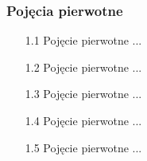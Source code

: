 \subsubsection{Pojęcia pierwotne}	
\begin{enumerate}	
    \item [1.1] Pojęcie pierwotne ... %
    \item [1.2] Pojęcie pierwotne ... %
    \item [1.3] Pojęcie pierwotne ... %
    \item [1.4] Pojęcie pierwotne ... %
    \item [1.5] Pojęcie pierwotne ... %
\end{enumerate}	
	
